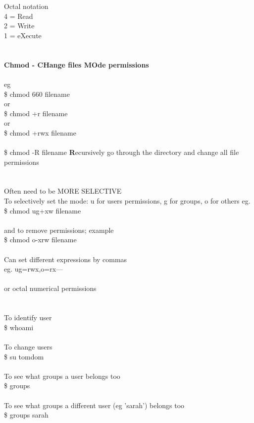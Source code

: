 \documentclass[10pt,a4paper]{article}
\begin{document}
{{{{{{{{{{{{{{{{{{{{\\
\\
Octal notation\\
4 = Read\\
2 = Write\\
1 = eXecute\\
\\
\\
\textbf{Chmod - CHange files MOde permissions}}{\large \\
\\
eg\\
\$ chmod 660 filename\\
or\\
\$ chmod +r filename\\
or\\
\$ chmod +rwx filename\\
\\
\$ chmod -R filename    \textbf{R}}{\large ecursively go through the directory and change all file permissions\\
\\
\\
Often need to be MORE SELECTIVE\\
To selectively set the mode:  u for users permissions, g for groups, o for others eg.\\
\$ chmod ug+xw filename\\
\\
and to remove permissions; example\\
\$ chmod o-xrw filename\\
\\
Can set different expressions by commas\\
eg. ug=rwx,o=rx— \\
\\
or octal numerical permissions\\
\\
\\
To identify user \\
\$ whoami\\
\\
To change users\\
\$ su tomdom\\
\\
To see what groups a user belongs too \\
\$ groups\\
\\
To see what groups a different user (eg 'sarah') belongs too \\
\$ groups sarah\\
}}}}}}}}}}}}}}}}}}}}
\end{document}
